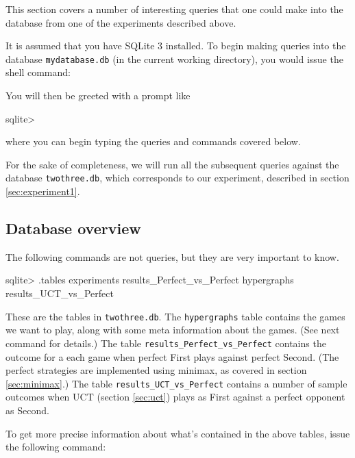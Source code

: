 This section covers a number of interesting queries that one could make into the database from one of the experiments described above.

It is assumed that you have SQLite 3 installed.
To begin making queries into the database \texttt{mydatabase.db} (in the current working directory), you would issue the shell command:
You will then be greeted with a prompt like
\begin{code}
sqlite> 
\end{code}
where you can begin typing the queries and commands covered below.

For the sake of completeness, we will run all the subsequent queries against the database \texttt{twothree.db}, which corresponds to our experiment, described in section \ref{sec:experiment1}.

\subsection{Database overview}

The following commands are not queries, but they are very important to know.
\begin{code}
sqlite> .tables
experiments                 results_Perfect_vs_Perfect
hypergraphs                 results_UCT_vs_Perfect  
\end{code}
These are the tables in \texttt{twothree.db}. The \texttt{hypergraphs} table contains the games we want to play, along with some meta information about the games. (See next command for details.)
The table \texttt{results\_Perfect\_vs\_Perfect} contains the outcome for a each game when perfect First plays against perfect Second. (The perfect strategies are implemented using minimax, as covered in section \ref{sec:minimax}.)
The table \texttt{results\_UCT\_vs\_Perfect} contains a number of sample outcomes when UCT (section \ref{sec:uct}) plays as First against a perfect opponent as Second.

To get more precise information about what's contained in the above tables, issue the following command:


